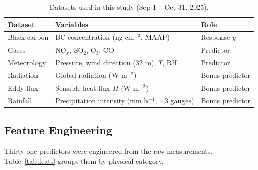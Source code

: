 \documentclass[11pt, a4paper]{article}
\begin{document}
\begin{table}[H]
\centering
\caption{Datasets used in this study (Sep 1 – Oct 31, 2025).}
\label{tab:data}
\vspace{2pt}
\small
\begin{tabular}{p{2.1cm} p{5.5cm} l}
\toprule
\textbf{Dataset}   & \textbf{Variables}                                          & \textbf{Role}      \\
\midrule
Black carbon       & BC concentration (ng cm$^{-3}$, MAAP)                       & Response $y$       \\
Gases              & NO$_x$, SO$_2$, O$_3$, CO                                  & Predictor          \\
Meteorology        & Pressure, wind direction (32 m), $T$, RH                   & Predictor          \\
Radiation          & Global radiation (W m$^{-2}$)                               & Bonus predictor    \\
Eddy flux          & Sensible heat flux $H$ (W m$^{-2}$)                        & Bonus predictor    \\
Rainfall           & Precipitation intensity (mm h$^{-1}$, $\times$3 gauges)    & Bonus predictor    \\
\bottomrule
\end{tabular}
\end{table}

\subsection{Feature Engineering}

Thirty-one predictors were engineered from the raw measurements. Table~\ref{tab:feats}
groups them by physical category.
\end{document}
